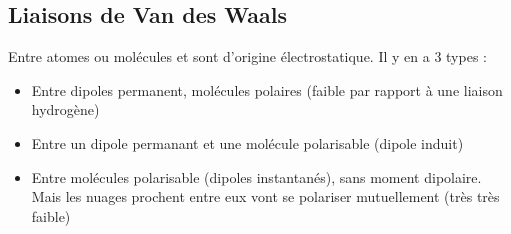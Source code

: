 \documentclass[french]{yLectureNote}
\begin{document}
\subsection{Liaisons de Van des Waals}
Entre atomes ou molécules et sont d'origine électrostatique. Il y en a 3 types :
\begin{itemize}
 \item Entre dipoles permanent, molécules polaires (faible par rapport à une liaison hydrogène)
 \item Entre un dipole permanant et une molécule polarisable (dipole induit)
 \item Entre molécules polarisable (dipoles instantanés), sans moment dipolaire. Mais les nuages prochent entre eux vont se polariser mutuellement (très très faible)
\end{itemize}
\end{document}
